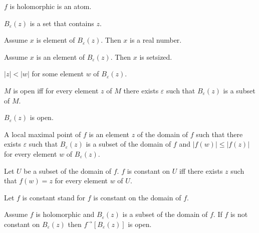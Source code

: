 \documentclass{article}
\newcommand{\Ball}[2]{B_{#1}(#2)}
\newcommand{\image}[2]{#1^{\to}[#2]}
\begin{document}
  \begin{forthel}
    \begin{signature}
      $f$ is holomorphic is an atom.
    \end{signature}

    \begin{signature}
      $\Ball{\varepsilon}{z}$ is a set that contains $z$.
    \end{signature}

    \begin{axiom}
      Assume $x$ is element of $\Ball{\varepsilon}{z}$. Then $x$ is a real number.
    \end{axiom}

    \begin{lemma}
      Assume $x$ is an element of $\Ball{\varepsilon}{z}$. Then $x$ is setsized.
    \end{lemma}

    \begin{axiom}
      $|z| < |w|$ for some element $w$ of $\Ball{\varepsilon}{z}$.
    \end{axiom}

    \begin{definition}
      $M$ is open iff for every element $z$ of $M$ there exists $\varepsilon$ such that
        $\Ball{\varepsilon}{z}$ is a subset of $M$.
    \end{definition}

    \begin{axiom}
      $\Ball{\varepsilon}{z}$ is open.
    \end{axiom}

    \begin{definition}
      A local maximal point of $f$ is an element $z$ of the domain of $f$ such that there exists $\varepsilon$ such that $\Ball{\varepsilon}{z}$ is a subset of the domain of $f$ and $|f(w)| \leq |f(z)|$ for every element $w$ of $\Ball{\varepsilon}{z}$.
    \end{definition}

    \begin{definition}
      Let $U$ be a subset of the domain of $f$. $f$ is constant on $U$ iff there exists $z$ such that $f(w) = z$ for every element $w$ of $U$.
    \end{definition}

    Let $f$ is constant stand for $f$ is constant on the domain of $f$.

    \begin{axiom}
      Assume $f$ is holomorphic and $\Ball{\varepsilon}{z}$ is a subset of the domain of $f$.
      If $f$ is not constant on $\Ball{\varepsilon}{z}$
        then $\image{f}{\Ball{\varepsilon}{z}}$ is open.
    \end{axiom}
  \end{forthel}
\end{document}
